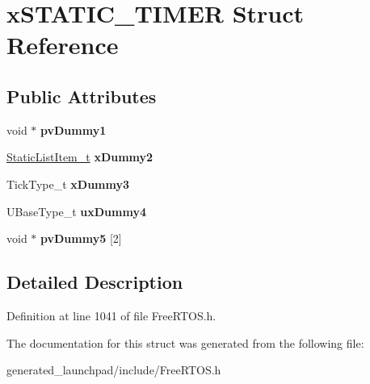 \hypertarget{structxSTATIC__TIMER}{}\section{x\+S\+T\+A\+T\+I\+C\+\_\+\+T\+I\+M\+ER Struct Reference}
\label{structxSTATIC__TIMER}
\subsection*{Public Attributes}
\begin{DoxyCompactItemize}
\item 
\mbox{\label{structxSTATIC__TIMER_a040499298faced6032f84f3a33c785fd}} 
void $\ast$ {\bfseries pv\+Dummy1}
\item 
\mbox{\label{structxSTATIC__TIMER_a622e2e596e5829c9197bb44b9009474f}} 
\mbox{\hyperlink{structxSTATIC__LIST__ITEM}{Static\+List\+Item\+\_\+t}} {\bfseries x\+Dummy2}
\item 
\mbox{\label{structxSTATIC__TIMER_a60d582d1d0b5b9b15e8050d5ae29bc30}} 
Tick\+Type\+\_\+t {\bfseries x\+Dummy3}
\item 
\mbox{\label{structxSTATIC__TIMER_abe61bde25ac09934004caa0222f4831b}} 
U\+Base\+Type\+\_\+t {\bfseries ux\+Dummy4}
\item 
\mbox{\label{structxSTATIC__TIMER_a9410b4450349079b65e2c25605913cbf}} 
void $\ast$ {\bfseries pv\+Dummy5} \mbox{[}2\mbox{]}
\end{DoxyCompactItemize}


\subsection{Detailed Description}


Definition at line 1041 of file Free\+R\+T\+O\+S.\+h.



The documentation for this struct was generated from the following file\+:\begin{DoxyCompactItemize}
\item 
generated\+\_\+launchpad/include/Free\+R\+T\+O\+S.\+h\end{DoxyCompactItemize}
